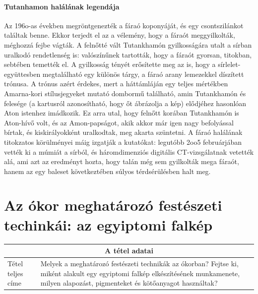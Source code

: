 \paragraph{Tutanhamon halálának legendája}
Az 196o-as években megröntgenezték a fáraó koponyáját, és egy csontszilánkot találtak benne. Ekkor terjedt el az a vélemény, hogy a fáraót meggyilkolták, méghozzá fejbe vágták. A felnőtté vált Tutankhamón gyilkosságára utalt a sírban uralkodó rendetlenség is: valószínűnek tartották, hogy a fáraót gyorsan, titokban, sebtében temették el. A gyilkosság tényét erősítette meg az is, hogy a sírlelet-együttesben megtalálható egy különös tárgy, a fáraó arany lemezekkel díszített trónusa. A trónus azért érdekes, mert a háttámláján egy teljes mértékben Amarna-kori stílusjegyeket mutató dombormű található, amin Tutankhamón és felesége (a kartusról azonosítható, hogy őt ábrázolja a kép) elődjéhez hasonlóan Aton istenhez imádkozik. Ez arra utal, hogy felnőtt korában Tutankhamón is Aton-hívő volt, és az Amon-papságot, akik akkor már igen nagy befolyással bírtak, és kiskirályokként uralkodtak, meg akarta szüntetni. A fáraó halálának titokzatos körülményei máig izgatják a kutatókat: legutóbb 2oo5 februárjában vették ki a múmiát a sírból, és háromdimenziós digitális CT-vizsgálatnak vetették alá, ami azt az eredményt hozta, hogy talán még sem gyilkolták mega fáraót, hanem az egy baleset következtében súlyos térdsérülésben halt meg.

\clearpage

\section{Az ókor meghatározó festészeti techinkái: az egyiptomi falkép}

\begin{center}
	\begin{longtable}{ | m{} | p{} | }
		
		\hline
		\multicolumn{2}{|c|}{\textbf{A tétel adatai}}
		\\ \hline
		
		\hline
		Tétel teljes címe	
		 &
		 Melyek a meghatározó festészeti technikák az ókorban? Fejtse ki, miként alakult egy egyiptomi falkép elkészítésének munkamenete, milyen alapozást, pigmenteket és kötőanyagot használtak?
		\\ \hline
		
	\end{longtable}
\end{center}

